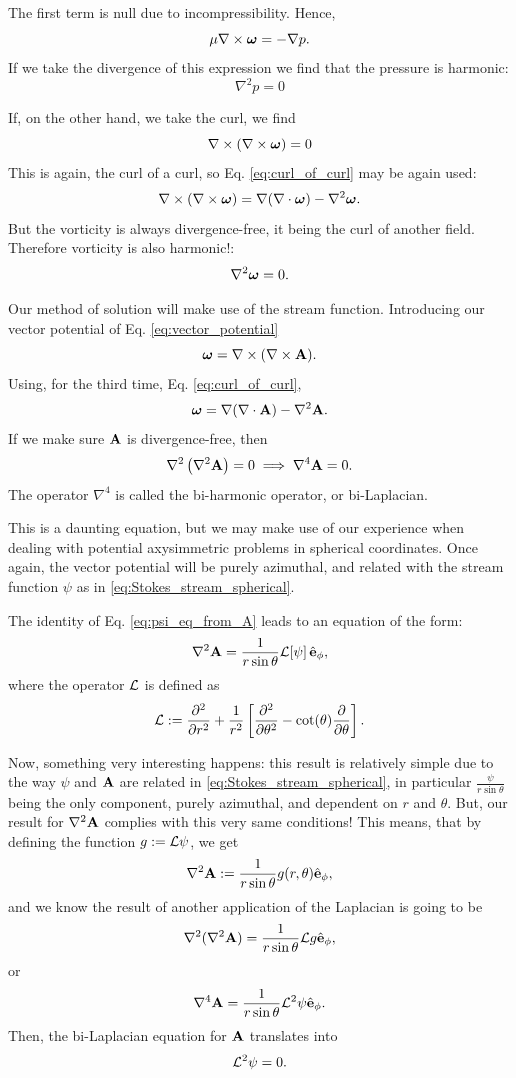 The first term is null due to incompressibility. Hence,
%
\begin{equation}\label{eq:creeping_p_vort}
\mu \nabla \times \bm{\omega} = - \nabla p.
\end{equation}
If we take the divergence of this expression we find that the pressure
is harmonic:
\[
  \nabla^2 p = 0
\]

If, on the other hand, we take the curl, we find
\[
  \nabla \times \left(\nabla \times \bm{\omega} \right)= 0
\]
This is again, the curl of a curl, so Eq. \ref{eq:curl_of_curl} may be
again used:
\begin{equation*}
  \nabla \times \left(\nabla \times \bm{\omega} \right)=
  \nabla (\nabla \cdot \bm{\omega} )-\nabla^{2}\bm{\omega} .
\end{equation*}
But the vorticity is always divergence-free, it being the curl of
another field. Therefore vorticity is also harmonic!:
\[
  \nabla^2 \bm{\omega} = 0 .
\]

Our method of solution will make use of the stream
function. Introducing our vector potential of
Eq. \ref{eq:vector_potential}
\[
  \bm{\omega} = \nabla \times ( \nabla \times \mathbf{A} ) .
\]
Using, for the third time,  Eq. \ref{eq:curl_of_curl},
\[
  \bm{\omega} =   \nabla (\nabla \cdot \mathbf {A} )-\nabla^2\mathbf{A} .
\]
If we make sure $\mathbf{A}$ is divergence-free, then
\begin{equation}
  \label{eq:bi-laplacian}
  \nabla^2 \left( \nabla^2\mathbf{A} \right) = 0 \implies
  \nabla^4 \mathbf{A}  = 0 .  
\end{equation}
The operator $\nabla^4$ is called the bi-harmonic operator, or
bi-Laplacian. 

This is a daunting equation, but we may make use of our experience
when dealing with potential axysimmetric problems in spherical
coordinates. Once again, the vector potential will be purely
azimuthal, and related with the stream function $\psi$ as in
\ref{eq:Stokes_stream_spherical}.

The identity of Eq. \ref{eq:psi_eq_from_A} leads to an equation of the
form:
\[
  \nabla^2\mathbf{A} = \frac{1}{r \sin\theta} {\cal L}[ \psi] \,  \hat{\mathbf{e}}_\phi ,
\]
where the operator $\cal L$ is defined as
\[
  {\cal L} :=
  \frac{\partial^2  }{\partial r^2} +
  \frac{1}{r^2} \left[
    \frac{\partial^2 }{\partial \theta^2} - 
    \cot(\theta) \frac{\partial }{\partial \theta}
  \right] .
\]

Now, something very interesting happens: this result is relatively
simple due to the way $\psi$ and $\mathbf{A}$ are related in
\ref{eq:Stokes_stream_spherical}, in particular
$\frac{\psi}{r \sin\theta}$ being the only component, purely
azimuthal, and dependent on $r$ and $\theta$.  But, our result for
$\nabla^2\mathbf{A}$ complies with this very same conditions!  This means,
that by defining the function $g:= {\cal L} \psi $, we get
\[
  \nabla^2\mathbf{A} := \frac{1}{r \sin\theta} g(r,\theta) \hat{\mathbf{e}}_\phi ,
\]
and we know the result of another application of the Laplacian is
going to be
\[
  \nabla^2( \nabla^2\mathbf{A}) = \frac{1}{r \sin\theta} {\cal L} g  \hat{\mathbf{e}}_\phi ,
\]
or
\[
  \nabla^4\mathbf{A} = \frac{1}{r \sin\theta} {\cal L}^2 \psi \hat{\mathbf{e}}_\phi .
\]
Then, the bi-Laplacian equation for $\mathbf{A}$ translates into
\[
  {\cal L}^2 \psi = 0.
\]

